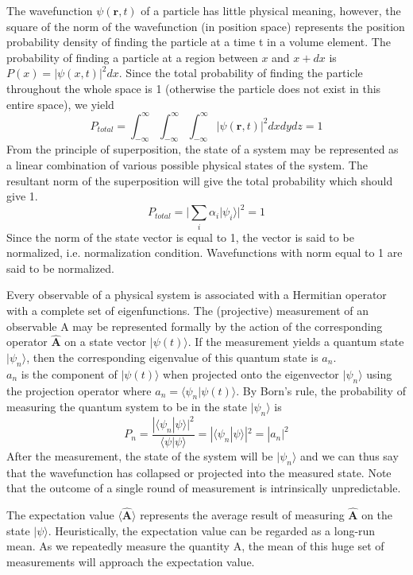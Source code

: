 \documentclass[a4paper]{article}
\begin{document}
\begin{Note}
The wavefunction $\psi(\textbf{r},t)$ of a particle has little physical meaning, however, the square of the norm of the wavefunction (in position space) represents the position probability density of finding the particle at a time t in a volume element. The probability of finding a particle at a region between $x$ and $x+dx$ is $P(x)=|\psi(x,t)|^2dx$.
Since the total probability of finding the particle throughout the whole space is 1 (otherwise the particle does not exist in this entire space), we yield
$$
P_{total}=\int_{-\infty}^{\infty}\int_{-\infty}^{\infty}\int_{-\infty}^{\infty}|\psi(\textbf{r},t)|^2dxdydz=1$$
From the principle of superposition, the state of a system may be represented as a linear combination of various possible physical states of the system. The resultant norm of the superposition will give the total probability which should give 1.
$$P_{total}=\bigg|\sum_{i}\alpha_i|\psi_i\big\rangle\bigg|^2=1$$
Since the norm of the state vector is equal to 1, the vector is said to be normalized, i.e. normalization condition. Wavefunctions with norm equal to 1 are said to be normalized.
\end{Note}
\begin{Note}
Every observable of a physical system is associated with a Hermitian operator with a complete set of eigenfunctions. The (projective) measurement of an observable A may be represented formally by the action of the corresponding operator $\mathbf{\hat{A}}$ on a state vector $|\psi(t)\big\rangle$. If the measurement yields a quantum state $|\psi_n\big\rangle$, then the corresponding eigenvalue of this quantum state is $a_n$.\\[5pt]
$a_n$ is the component of $|\psi(t)\big\rangle$ when projected onto the eigenvector $|\psi_n\big\rangle$ using the projection operator where $a_n=\big\langle\psi_n|\psi(t)\big\rangle$. By Born's rule, the probability of measuring the quantum system to be in the state $|\psi_n\big\rangle$ is 
$$P_n=\frac{|\big\langle\psi_n|\psi\big\rangle|^2}{\big\langle\psi|\psi\big\rangle}=|\big\langle\psi_n|\psi\big\rangle|^2=|a_n|^2$$
After the measurement, the state of the system will be $|\psi_n\big\rangle$  and we can thus say that the wavefunction has collapsed or projected into the measured state. Note that the outcome of a single round of measurement is intrinsically unpredictable. 
\end{Note}
\begin{defi}[Expectation]
The expectation value $\big\langle\mathbf{\hat{A}}\big\rangle$ represents the average result of measuring $\mathbf{\hat{A}}$ on the state $|\psi\big\rangle$. Heuristically, the expectation value can be regarded as a long-run mean. As we repeatedly measure the quantity A, the mean of this huge set of measurements will approach the expectation value.
\end{defi}
\end{document}
